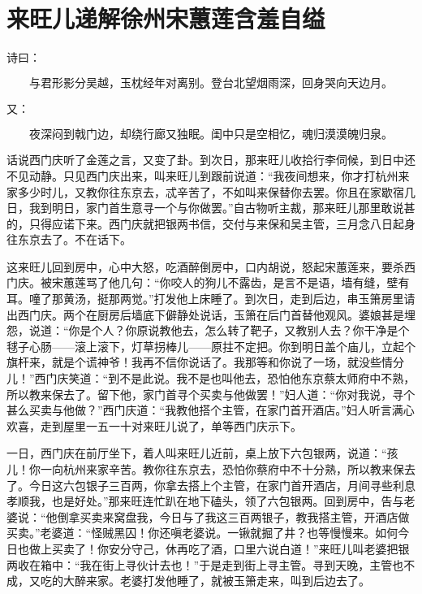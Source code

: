 

\chapter{来旺儿递解徐州\KG 宋蕙莲含羞自缢}


诗曰：

\[
与君形影分吴越，玉枕经年对离别。
登台北望烟雨深，回身哭向天边月。
\]

又：

\[
夜深闷到戟门边，却绕行廊又独眠。
闺中只是空相忆，魂归漠漠魄归泉。
\]

话说西门庆听了金莲之言，又变了卦。到次日，那来旺儿收拾行李伺候，到日中还不见动静。只见西门庆出来，叫来旺儿到跟前说道：“我夜间想来，你才打杭州来家多少时儿，又教你往东京去，忒辛苦了，不如叫来保替你去罢。你且在家歇宿几日，我到明日，家门首生意寻一个与你做罢。”自古物听主裁，那来旺儿那里敢说甚的，只得应诺下来。西门庆就把银两书信，交付与来保和吴主管，三月念八日起身往东京去了。不在话下。

这来旺儿回到房中，心中大怒，吃酒醉倒房中，口内胡说，怒起宋蕙莲来，要杀西门庆。被宋蕙莲骂了他几句：“你咬人的狗儿不露齿，是言不是语，墙有缝，壁有耳。噇了那黄汤，挺那两觉。”打发他上床睡了。到次日，走到后边，串玉箫房里请出西门庆。两个在厨房后墙底下僻静处说话，玉箫在后门首替他观风。婆娘甚是埋怨，说道：“你是个人？你原说教他去，怎么转了靶子，又教别人去？你干净是个毬子心肠——滚上滚下，灯草拐棒儿——原拄不定把。你到明日盖个庙儿，立起个旗杆来，就是个谎神爷！我再不信你说话了。我那等和你说了一场，就没些情分儿！”西门庆笑道：“到不是此说。我不是也叫他去，恐怕他东京蔡太师府中不熟，所以教来保去了。留下他，家门首寻个买卖与他做罢！”妇人道：“你对我说，寻个甚么买卖与他做？”西门庆道：“我教他搭个主管，在家门首开酒店。”妇人听言满心欢喜，走到屋里一五一十对来旺儿说了，单等西门庆示下。

一日，西门庆在前厅坐下，着人叫来旺儿近前，桌上放下六包银两，说道：“孩儿！你一向杭州来家辛苦。教你往东京去，恐怕你蔡府中不十分熟，所以教来保去了。今日这六包银子三百两，你拿去搭上个主管，在家门首开酒店，月间寻些利息孝顺我，也是好处。”那来旺连忙趴在地下磕头，领了六包银两。回到房中，告与老婆说：“他倒拿买卖来窝盘我，今日与了我这三百两银子，教我搭主管，开酒店做买卖。”老婆道：“怪贼黑囚！你还嗔老婆说。一锹就掘了井？也等慢慢来。如何今日也做上买卖了！你安分守己，休再吃了酒，口里六说白道！”来旺儿叫老婆把银两收在箱中：“我在街上寻伙计去也！”于是走到街上寻主管。寻到天晚，主管也不成，又吃的大醉来家。老婆打发他睡了，就被玉箫走来，叫到后边去了。


